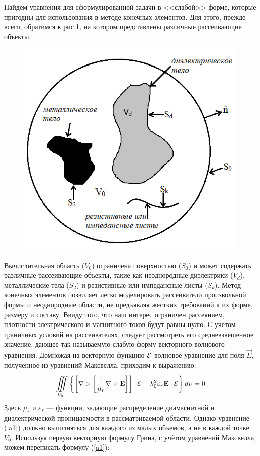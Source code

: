 Найдём уравнения для сформулированной задачи в <<слабой>> форме, которые пригодны для использования в методе конечных элементов. Для этого, прежде всего, обратимся к рис.\ref {fig:tes2}, на котором представлены различные рассеивающие объекты.
\begin{figure}[h]
	\centering
	\includegraphics[width=0.6\linewidth]{tes2}
	\caption{}
	\label{fig:tes2}
\end{figure}
Вычислительная область ($ V_{0} $) ограничена поверхностью ($ S_{0} $) и может содержать различные рассеивающие объекты, такие как неоднородные диэлектрики ($ V_{d} $), металлические тела ($ S_{2} $) и резистивные или импедансные листы ($ S_{k} $). Метод конечных элементов позволяет легко моделировать рассеиватели произвольной формы и неоднородные области, не предъявляя жестких требований к их форме, размеру и составу. Ввиду того, что наш интерес ограничен рассеянием, плотности электрического и магнитного токов будут равны нулю.
С учетом граничных условий на рассеивателях, следует рассмотреть его средневзвешенное значение, дающее так называемую слабую форму векторного волнового уравнения. Домножая на векторную функцию $ \vec{\cal{E}} $ волновое уравнение для поля $\vec{E}$, полученное из уравнений Максвелла, приходим к выражению:
\begin{equation}\label{a1}
	\iiint\limits_{V_{0}}^{} \left\{\left[ \nabla \times \left[ \dfrac{1}{\mu_{r}}\nabla \times \vec{E}\right]\right]\cdot \vec{\cal{E}} - k_{0}^{2} \varepsilon_{r}\vec{E} \cdot \vec{\cal{E}} \right\}d\upsilon = 0
\end{equation}
Здесь $\mu_r$ и $\varepsilon_r$ --- функции, задающие распределение диамагнитной и диэлектрической проницаемости в рассматриваемой области. Однако уравнение (\ref{a1}) должно выполняться для каждого из малых объемов, а не в каждой точке $ V_{0} $. Используя первую векторную формулу Грина, с учётом уравнений Максвелла, можем переписать формулу (\ref{a1}): \\
